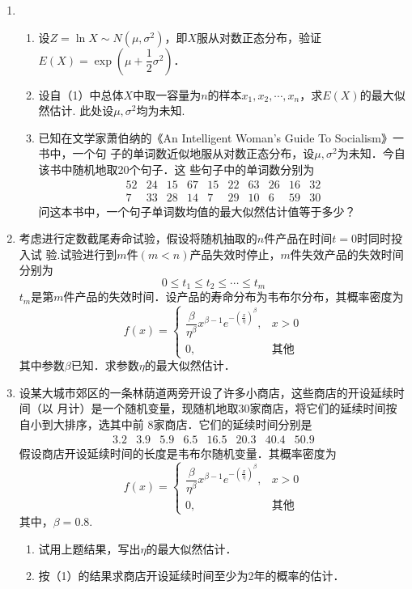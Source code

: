 \documentclass[10pt,a4paper]{article}
\begin{document}
\begin{enumerate}
    \item \begin{enumerate}
        \item 设$Z=\ln X\sim N(\mu,\sigma^2)$，即$X$服从对数正态分布，验证$E(X)=\exp (\mu+\dfrac{1}{2}\sigma^2)$．
        \item 设自（1）中总体$X$中取一容量为$n$的样本$x_1,x_2,\cdots,x_n$，求$E(X)$的最大似然估计.
        此处设$\mu,\sigma^2$均为未知.
        \item 已知在文学家萧伯纳的《An Intelligent Woman's Guide To Socialism》一书中，一个句
        子的单词数近似地服从对数正态分布，设$\mu,\sigma^2$为未知．今自该书中随机地取20个句子．这
        些句子中的单词数分别为
        $$\begin{array}{cccccccccc}
            52 & 24 & 15 & 67 & 15 & 22 & 63 & 26 & 16 & 32\\
            7 & 33 & 28 & 14 & 7 & 29 & 10 & 6 & 59 & 30 
        \end{array}$$
        问这本书中，一个句子单词数均值的最大似然估计值等于多少？
    \end{enumerate}






    \item 考虑进行定数截尾寿命试验，假设将随机抽取的$n$件产品在时间$t=0$时同时投入试
    验.试验进行到$m$件$(m<n)$产品失效时停止，$m$件失效产品的失效时间分别为
    $$0\leq t_1 \leq t_2 \leq \cdots \leq t_m$$
    $t_m$是第$m$件产品的失效时间．设产品的寿命分布为韦布尔分布，其概率密度为
    $$f(x)=\left\{\begin{array}{ll}
        \dfrac{\beta}{\eta ^\beta}x^{\beta-1}e^{{-(\frac{x}{\eta})}^\beta}, & x>0\\
        0, & \mbox{其他}
    \end{array}\right.$$
    其中参数$\beta$已知．求参数$\eta$的最大似然估计．





    \item 设某大城市郊区的一条林荫道两旁开设了许多小商店，这些商店的开设延续时间（以
    月计）是一个随机变量，现随机地取30家商店，将它们的延续时间按自小到大排序，选其中前
    8家商店．它们的延续时间分别是
    $$\begin{array}{cccccccc}
        3.2 & 3.9 & 5.9 & 6.5 & 16.5 & 20.3 & 40.4 & 50.9
    \end{array}$$
    假设商店开设延续时间的长度是韦布尔随机变量．其概率密度为
    $$f(x)=\left\{\begin{array}{ll}
        \dfrac{\beta}{\eta ^\beta}x^{\beta-1}e^{{-(\frac{x}{\eta})}^\beta}, & x>0\\
        0, & \mbox{其他}
    \end{array}\right.$$
    其中，$\beta=0.8$.
    \begin{enumerate}
        \item 试用上题结果，写出$\eta$的最大似然估计．
        \item 按（1）的结果求商店开设延续时间至少为2年的概率的估计．
    \end{enumerate}







\end{enumerate}
\end{document}
